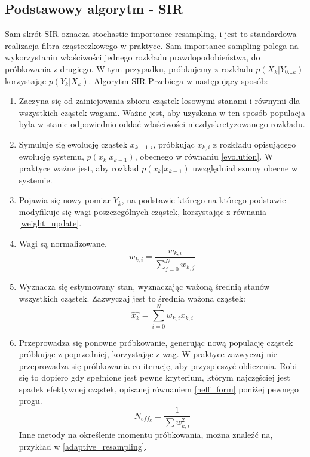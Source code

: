 \documentclass[10pt,a4paper]{article}
\begin{document}
\subsection{Podstawowy algorytm - SIR}
Sam skrót SIR oznacza stochastic importance resampling, i jest to standardowa realizacja filtra cząsteczkowego w praktyce. Sam importance sampling polega na wykorzystaniu właściwości jednego rozkładu prawdopodobieństwa, do próbkowania z drugiego. W tym przypadku, próbkujemy z rozkładu $p(X_k|Y_{0...k})$ korzystając $p(Y_k|X_k)$.
Algorytm SIR Przebiega w następujący sposób:
\begin{enumerate}[label=(\alph*)]
	\item Zaczyna się od zainicjowania zbioru cząstek losowymi stanami i równymi dla wszystkich cząstek wagami. Ważne jest, aby uzyskana w ten sposób populacja była w stanie odpowiednio oddać właściwości niezdyskretyzowanego rozkładu.
	
	\item Symuluje się ewolucję cząstek $x_{k-1,i}$, próbkując $x_{k,i}$ z rozkładu opisującego ewolucję systemu, $p(x_k|x_{k-1})$, obecnego w równaniu \ref{evolution}. W praktyce ważne jest, aby rozkład $p(x_k|x_{k-1})$ uwzględniał szumy obecne w systemie.
	
	\item Pojawia się nowy pomiar $Y_k$, na podstawie którego na którego podstawie modyfikuje się wagi poszczególnych cząstek, korzystając z równania \ref{weight_update}.

	\item Wagi są normalizowane.	
	\begin{equation}
		w_{k,i}=\frac{w_{k,i}}{\sum_{j=0}^{N} w_{k,j}}
	\end{equation}

	\item Wyznacza się estymowany stan, wyznaczając ważoną średnią stanów wszystkich cząstek. Zazwyczaj jest to średnia ważona cząstek:
	\begin{equation}
		\hat{x_k} = \sum_{i=0}^{N} w_{k,i} x_{k,i}
	\end{equation}
	\item Przeprowadza się ponowne próbkowanie, generując nową populację cząstek próbkując z poprzedniej, korzystając z wag. W praktyce zazwyczaj nie przeprowadza się próbkowania co iterację, aby przyspieszyć obliczenia. Robi się to dopiero gdy spełnione jest pewne kryterium, którym najczęściej jest spadek efektywnej cząstek, opisanej równaniem \ref{neff_form} poniżej pewnego progu.
	\begin{equation}\label{neff_form}
		N_{eff_k} = \dfrac{1}{\sum w_{k,i}^2}
	\end{equation}
	Inne metody na określenie momentu próbkowania, można znaleźć na, przykład w \ref{adaptive_resampling}.
\end{enumerate}
\end{document}

